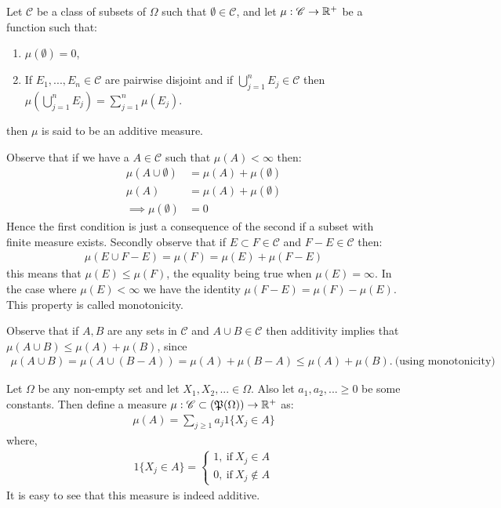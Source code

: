 \begin{definition}
  Let $ \mathscr{C}$ be a class of subsets of $\Omega$ such that $\emptyset \in \mathscr{C}$, and let $\mu: \mathscr{C}\to\mathbb{R}^+$ be a function such that:
  \begin{enumerate}
    \item $\mu(\emptyset) = 0$,
    \item If $E_1,...,E_n \in \mathscr{C}$ are pairwise disjoint and if $\bigcup_{j=1}^nE_j \in \mathscr{C}$ then $\mu(\bigcup_{j=1}^nE_j)=\sum_{j=1}^n\mu(E_j)$.
  \end{enumerate}
  then $\mu$ is said to be an additive measure.
\end{definition}
\begin{remark}
Observe that if we have a $A\in \mathscr{C}$ such that $\mu(A)<\infty$ then:
\begin{align*}
  \mu(A\cup \emptyset) &= \mu(A) + \mu(\emptyset)\\
  \mu(A) &= \mu(A) + \mu(\emptyset)\\
  \implies \mu(\emptyset) &= 0
\end{align*}
Hence the first condition is just a consequence of the second if a subset with finite measure exists. Secondly observe that if $E\subset F \in \mathscr{C}$ and $F-E\in \mathscr{C}$ then:
\begin{align*}
  \mu(E\cup F-E) = \mu(F) = \mu(E) + \mu(F-E)
\end{align*}
this means that $\mu(E)\leq \mu(F)$, the equality being true when $\mu(E) = \infty$. In the case where $\mu(E)<\infty$ we have the identity $\mu(F-E) = \mu(F)-\mu(E)$. This property is called monotonicity. 
\end{remark}
\begin{remark}
  Observe that if $A, B$ are any sets in $ \mathscr{C}$ and $A\cup B\in \mathscr{C}$ then additivity implies that $\mu(A\cup B) \leq \mu(A) + \mu(B)$, since
  \begin{align*}
    \mu(A\cup B) = \mu(A \cup (B-A)) = \mu(A) + \mu(B-A) \leq \mu(A) + \mu(B).\ \text{(using monotonicity)}
  \end{align*}
\end{remark}
\begin{example}
  Let $\Omega$ be any non-empty set and let $X_1,X_2,...\in \Omega$. Also let $a_1, a_2,...\geq0$ be some constants. Then define a measure $\mu: \mathscr{C}\subset (\mathfrak{P}(\Omega))\to \mathbb{R}^+$ as:
  \begin{align*}
    \mu(A) = \sum_{j\geq 1} a_j 1\{X_j\in A\}
  \end{align*}
  where,
  \begin{align*}
    1\{X_j\in A\} = \begin{cases}
      1,\ \text{if}\ X_j\in A\\
      0,\ \text{if}\ X_j\notin A
    \end{cases}
  \end{align*}
  It is easy to see that this measure is indeed additive. 
\end{example}
